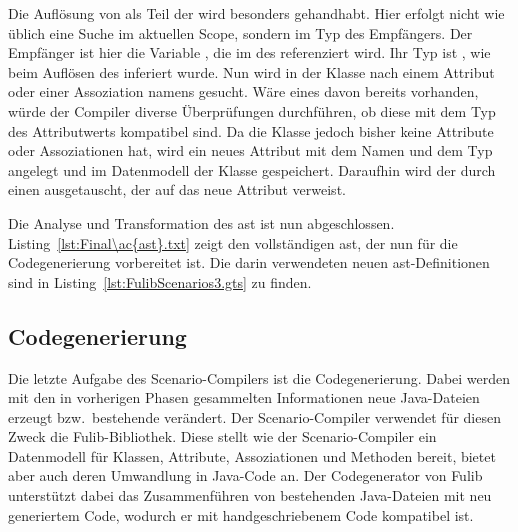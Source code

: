 Die Auflösung von  als Teil der  wird besonders gehandhabt.
Hier erfolgt nicht wie üblich eine Suche im aktuellen Scope, sondern im Typ des Empfängers.
Der Empfänger ist hier die Variable , die im  des  referenziert wird.
Ihr Typ ist , wie beim Auflösen des  inferiert wurde.
Nun wird in der Klasse  nach einem Attribut oder einer Assoziation namens  gesucht.
Wäre eines davon bereits vorhanden, würde der Compiler diverse Überprüfungen durchführen, ob diese mit dem Typ des Attributwerts kompatibel sind.
Da die Klasse  jedoch bisher keine Attribute oder Assoziationen hat, wird ein neues Attribut mit dem Namen  und dem Typ  angelegt und im Datenmodell der Klasse  gespeichert.
Daraufhin wird der  durch einen  ausgetauscht, der auf das neue Attribut verweist.

Die Analyse und Transformation des \ac{ast} ist nun abgeschlossen.
Listing~\ref{lst:Final\ac{ast}.txt} zeigt den vollständigen \ac{ast}, der nun für die Codegenerierung vorbereitet ist.
Die darin verwendeten neuen \ac{ast}-Definitionen sind in Listing~\ref{lst:FulibScenarios3.gts} zu finden.



\subsection{Codegenerierung}\label{subsec:codegen-fulib}

Die letzte Aufgabe des Scenario-Compilers ist die Codegenerierung.
Dabei werden mit den in vorherigen Phasen gesammelten Informationen neue Java-Dateien erzeugt bzw.\ bestehende verändert.
Der Scenario-Compiler verwendet für diesen Zweck die Fulib-Bibliothek\cite{fulib}.
Diese stellt wie der Scenario-Compiler ein Datenmodell für Klassen, Attribute, Assoziationen und Methoden bereit, bietet aber auch deren Umwandlung in Java-Code an.
Der Codegenerator von Fulib unterstützt dabei das Zusammenführen von bestehenden Java-Dateien mit neu generiertem Code, wodurch er mit handgeschriebenem Code kompatibel ist.

